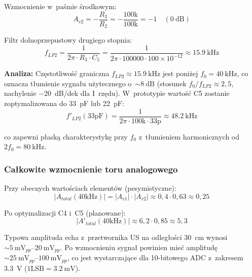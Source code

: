 \documentclass[a4paper,11pt]{article}
\begin{document}
Wzmocnienie w~paśmie środkowym:
\begin{equation}
    A_{v2} = -\frac{R_3}{R_2} = -\frac{100\text{k}}{100\text{k}} = -1 \quad (\SI{0}{\deci\bel})
    \label{eq:gain2}
\end{equation}

Filtr dolnoprzepustowy drugiego stopnia:
\begin{equation}
    f_{LP2} = \frac{1}{2\pi \cdot R_3 \cdot C_5} = \frac{1}{2\pi \cdot 100000 \cdot 100 \times 10^{-12}} \approx \SI{15,9}{\kilo\hertz}
    \label{eq:flp2}
\end{equation}

\textbf{Analiza:} Częstotliwość graniczna $f_{LP2} \approx \SI{15,9}{\kilo\hertz}$
jest poniżej $f_0 = \SI{40}{\kilo\hertz}$, co oznacza tłumienie sygnału
użytecznego o~${\sim}\SI{8}{\deci\bel}$ (stosunek $f_0/f_{LP2} \approx 2{,}5$,
nachylenie \SI{-20}{\deci\bel}/dek dla I~rzędu). W~prototypie wartość C5
zostanie zoptymalizowana do \SI{33}{\pico\farad} lub \SI{22}{\pico\farad}:
\begin{equation}
    f'_{LP2}(33\text{pF}) = \frac{1}{2\pi \cdot 100\text{k} \cdot 33\text{p}} \approx \SI{48,2}{\kilo\hertz}
    \label{eq:flp2_opt}
\end{equation}

co zapewni płaską charakterystykę przy $f_0$ z~tłumieniem harmonicznych
od $2f_0 = \SI{80}{\kilo\hertz}$.

\subsubsection{Całkowite wzmocnienie toru analogowego}

Przy obecnych wartościach elementów (pesymistyczne):
\begin{equation}
    |A_{total}(40\text{kHz})| = |A_{v1}| \cdot |A_{v2}| \approx 0{,}4 \cdot 0{,}63 \approx 0{,}25
    \label{eq:gain_total_current}
\end{equation}

Po optymalizacji C4 i~C5 (planowane):
\begin{equation}
    |A'_{total}(40\text{kHz})| \approx 6{,}2 \cdot 0{,}85 \approx 5{,}3
    \label{eq:gain_total_opt}
\end{equation}

Typowa amplituda echa z~przetwornika US na odległości \SI{30}{\centi\metre}
wynosi ${\sim}\SIrange{5}{20}{\milli\volt_{pp}}$. Po wzmocnieniu sygnał
powinien mieć amplitudę ${\sim}\SIrange{25}{100}{\milli\volt_{pp}}$, co jest
wystarczające dla 10-bitowego ADC z~zakresem \SI{3,3}{\volt}
($1\text{LSB} = \SI{3,2}{\milli\volt}$).
\end{document}
